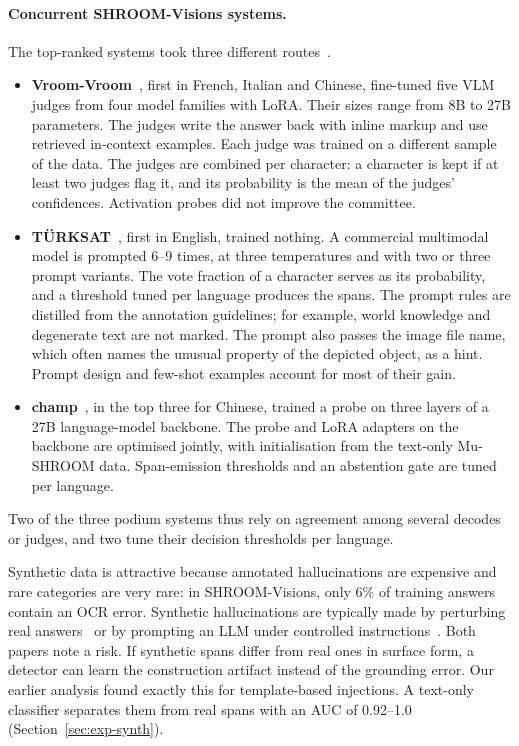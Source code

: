 \paragraph{Concurrent SHROOM-Visions systems.}
The top-ranked systems took three different routes~\cite{vazquez2026shroomvisionsoverview}.
\begin{itemize}
    \item \textbf{Vroom-Vroom}~\cite{vroomvroom2026}, first in French, Italian and Chinese, fine-tuned five VLM judges from four model families with LoRA. Their sizes range from 8B to 27B parameters. The judges write the answer back with inline markup and use retrieved in-context examples. Each judge was trained on a different sample of the data. The judges are combined per character: a character is kept if at least two judges flag it, and its probability is the mean of the judges' confidences. Activation probes did not improve the committee.
    \item \textbf{TÜRKSAT}~\cite{karamanlioglu2026turksat}, first in English, trained nothing. A commercial multimodal model is prompted 6--9 times, at three temperatures and with two or three prompt variants. The vote fraction of a character serves as its probability, and a threshold tuned per language produces the spans. The prompt rules are distilled from the annotation guidelines; for example, world knowledge and degenerate text are not marked. The prompt also passes the image file name, which often names the unusual property of the depicted object, as a hint. Prompt design and few-shot examples account for most of their gain.
    \item \textbf{champ}~\cite{jara2026champ}, in the top three for Chinese, trained a probe on three layers of a 27B language-model backbone. The probe and LoRA adapters on the backbone are optimised jointly, with initialisation from the text-only Mu-SHROOM data. Span-emission thresholds and an abstention gate are tuned per language.
\end{itemize}
Two of the three podium systems thus rely on agreement among several decodes or judges, and two tune their decision thresholds per language.

Synthetic data is attractive because annotated hallucinations are expensive and rare categories are very rare: in SHROOM-Visions, only 6\% of training answers contain an OCR error. Synthetic hallucinations are typically made by perturbing real answers~\cite{zhang2024perturbation} or by prompting an LLM under controlled instructions~\cite{xie2024controlled}. Both papers note a risk. If synthetic spans differ from real ones in surface form, a detector can learn the construction artifact instead of the grounding error. Our earlier analysis found exactly this for template-based injections. A text-only classifier separates them from real spans with an AUC of 0.92--1.0 (Section~\ref{sec:exp-synth}).

